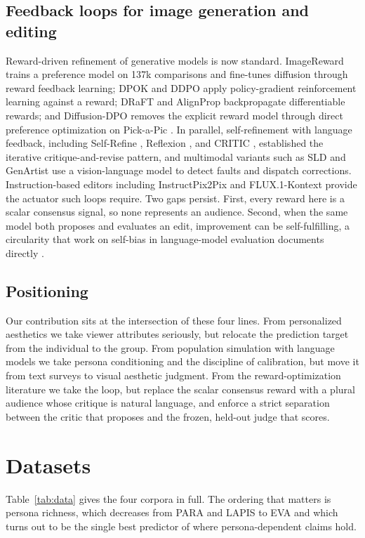 \documentclass[10pt,twocolumn,letterpaper]{article}
\begin{document}
\subsection{Feedback loops for image generation and editing}
Reward-driven refinement of generative models is now standard. ImageReward \citep{xu2023imagereward} trains a preference model on 137k comparisons and fine-tunes diffusion through reward feedback learning; DPOK \citep{fan2023dpok} and DDPO \citep{black2024ddpo} apply policy-gradient reinforcement learning against a reward; DRaFT \citep{clark2024draft} and AlignProp \citep{prabhudesai2023alignprop} backpropagate differentiable rewards; and Diffusion-DPO \citep{wallace2024dpo} removes the explicit reward model through direct preference optimization on Pick-a-Pic \citep{kirstain2023pickapic}. In parallel, self-refinement with language feedback, including Self-Refine \citep{madaan2023selfrefine}, Reflexion \citep{shinn2023reflexion}, and CRITIC \citep{gou2024critic}, established the iterative critique-and-revise pattern, and multimodal variants such as SLD \citep{wu2024sld} and GenArtist \citep{wang2024genartist} use a vision-language model to detect faults and dispatch corrections. Instruction-based editors including InstructPix2Pix \citep{brooks2023instructpix2pix} and FLUX.1-Kontext \citep{flux2024} provide the actuator such loops require. Two gaps persist. First, every reward here is a scalar consensus signal, so none represents an audience. Second, when the same model both proposes and evaluates an edit, improvement can be self-fulfilling, a circularity that work on self-bias in language-model evaluation documents directly \citep{xu2024selfbias}.

\subsection{Positioning}
Our contribution sits at the intersection of these four lines. From personalized aesthetics we take viewer attributes seriously, but relocate the prediction target from the individual to the group. From population simulation with language models we take persona conditioning and the discipline of calibration, but move it from text surveys to visual aesthetic judgment. From the reward-optimization literature we take the loop, but replace the scalar consensus reward with a plural audience whose critique is natural language, and enforce a strict separation between the critic that proposes and the frozen, held-out judge that scores.


\section{Datasets}
Table~\ref{tab:data} gives the four corpora in full. The ordering that matters is persona richness, which decreases from PARA and LAPIS to EVA and which turns out to be the single best predictor of where persona-dependent claims hold.
\end{document}
